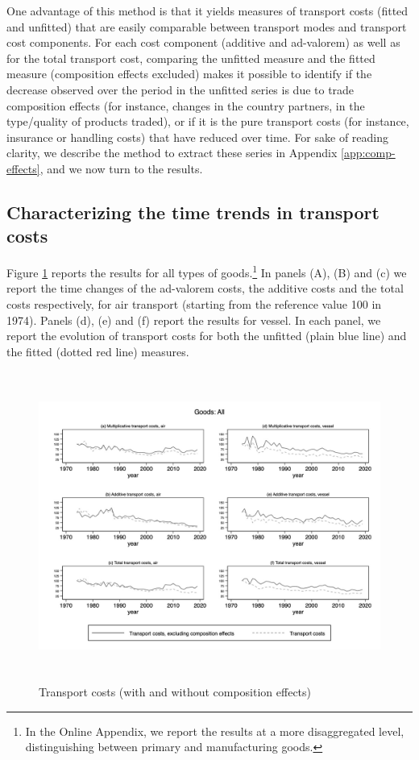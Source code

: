 \documentclass[a4paper,11pt]{article}
\begin{document}
One advantage of this method is that it yields measures of transport costs (fitted and unfitted) that are easily comparable between transport modes and transport cost components.
For each cost component (additive and ad-valorem) as well as for the total transport cost, comparing the unfitted measure and the fitted measure (composition effects excluded) makes it possible to identify if the decrease observed over the period in the unfitted series is due to trade composition effects (for instance, changes in the country partners, in the type/quality of products traded), or if it is the pure transport costs (for instance, insurance or handling costs) that have reduced over time. For sake of reading clarity, we describe the method to extract these series in Appendix \ref{app:comp-effects}, and we now turn to the results.



\subsection{Characterizing the time trends in transport costs}
Figure \ref{fig:totalTC_compeffects_excl} reports the results for all types of goods.\footnote{In the Online Appendix, we report the results at a more disaggregated level, distinguishing between primary and manufacturing goods.} In panels (A), (B) and (c) we report the time changes of the ad-valorem costs, the additive costs and the total costs respectively, for air transport (starting from the reference value 100 in 1974).
Panels (d), (e) and (f) report the results for vessel.
In each panel, we report the evolution of transport costs for both the unfitted (plain blue line) and the fitted (dotted red line) measures.


\begin{figure}[htbp]
\caption{Transport costs (with and without composition effects)}
\label{fig:totalTC_compeffects_excl}
\begin{center}
\includegraphics[height=4in]
{graph_composition_all.jpg}
\end{center}
\end{figure}
\end{document}
